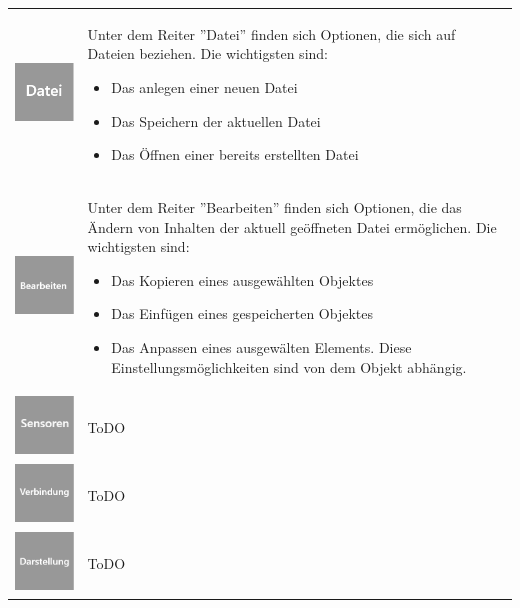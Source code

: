 \documentclass[parskip=full]{scrartcl}
\begin{document}
\begin{tabular}[t]{p{1cm} p{10cm}}
	\vspace{0cm}\includegraphics[width = 1 cm]{Grafik/Datei.jpg} & Unter dem Reiter ''Datei'' finden sich Optionen, die sich auf Dateien beziehen. Die wichtigsten sind: 
	\begin{itemize} 
		\item Das anlegen einer neuen Datei
		\item Das Speichern der aktuellen Datei
		\item Das Öffnen einer bereits erstellten Datei
	\end{itemize}\\
	\vspace{0cm}\includegraphics[width = 1 cm]{Grafik/Bearbeiten.jpg} & Unter dem Reiter ''Bearbeiten'' finden sich Optionen, die das Ändern von Inhalten der aktuell geöffneten Datei ermöglichen. Die wichtigsten sind:
	\begin{itemize} 
		\item Das Kopieren eines ausgewählten Objektes
		\item Das Einfügen eines gespeicherten Objektes
		\item Das Anpassen eines ausgewälten Elements. Diese Einstellungsmöglichkeiten sind von dem Objekt abhängig.
	\end{itemize}\\
	\vspace{0cm}\includegraphics[width = 1 cm]{Grafik/Sensor.jpg} & ToDO\\
	\vspace{0cm}\includegraphics[width = 1 cm]{Grafik/Verbindung.jpg} & ToDO\\
	\vspace{0cm}\includegraphics[width = 1 cm]{Grafik/Darstellung.jpg} & ToDO\\

\end{tabular}
\end{document}

